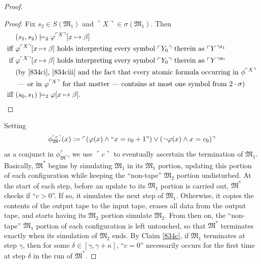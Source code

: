 \documentclass[12pt, twoside]{memoir}
\numberwithin{equation}{section}
\theoremstyle{definition}
\theoremstyle{remark}
\theoremstyle{definition}
\theoremstyle{definition}
\theoremstyle{definition}
\theoremstyle{remark}
\begin{document}
\begin{proof}
\begin{proof}
Fix $s_2 \in S(\mathfrak{M}_1)$ and $\ulcorner X \urcorner \in \sigma(\mathfrak{M}_1)$. Then 
\begin{align*}
    & (s_1, s_2) \models_2 \varphi^{\ulcorner X \urcorner}[x \mapsto \beta] \\
    \text{iff } & \varphi^{\ulcorner X \urcorner}[x \mapsto \beta] \text{ holds interpreting every symbol } \ulcorner Y_0 \urcorner \text{ therein as } \ulcorner Y \urcorner^{s_1} \\
    \text{if } & \varphi^{\ulcorner X \urcorner}[x \mapsto \beta] \text{ holds interpreting every symbol } \ulcorner Y_0 \urcorner \text{ therein as } \ulcorner Y \urcorner^{s_0} \\
    & \text{(by \ref{834ci}, \ref{834ciii} and the fact that every atomic formula occurring in } \phi^{\ulcorner X \urcorner} \\
    & \text{ --- or in } \varphi^{\ulcorner X \urcorner} \text{ for that matter --- contains at most one symbol from } 2 \cdot \sigma \text{)} \\
    \text{iff } & (s_0, s_1) \models_2 \varphi[x \mapsto \beta] \text{.} \qedhere
\end{align*}
\end{proof}

Setting
\begin{equation*}
    \phi^{\ulcorner c \urcorner}_{\mathfrak{M}^*}(x) := \ulcorner (\varphi(x) \wedge ``x = c_0 + 1") \vee (\neg \varphi(x) \wedge x = c_0) \urcorner 
\end{equation*}
as a conjunct in $\phi^{\tau}_{\mathfrak{M}^*}$, we use $\ulcorner c \urcorner$ to eventually ascertain the termination  of $\mathfrak{M}_1$. Basically, $\mathfrak{M}^*$ begins by simulating $\mathfrak{M}_1$ in its $\mathfrak{M}_1$ portion, updating this portion of each configuration while keeping the ``non-tape'' $\mathfrak{M}_2$ portion undisturbed. At the start of each step, before an update to its $\mathfrak{M}_1$ portion is carried out, $\mathfrak{M}^*$ checks if ``$c > 0$''. If so, it simulates the next step of $\mathfrak{M}_1$. Otherwise, it copies the contents of the output tape to the input tape, erases all data from the output tape, and starts having its $\mathfrak{M}_2$ portion simulate $\mathfrak{M}_2$. From then on, the ``non-tape'' $\mathfrak{M}_1$ portion of each configuration is left untouched, so that $\mathfrak{M}^*$ terminates exactly when its simulation of $\mathfrak{M}_2$ ends. By Claim \ref{834c}, if $\mathfrak{M}_1$ terminates at step $\gamma$, then for some $\delta \in [\gamma, \gamma + \kappa]$, ``$c = 0$'' necessarily occurs for the first time at step $\delta$ in the run of $\mathfrak{M}^*$.
\end{proof}
\end{document}
